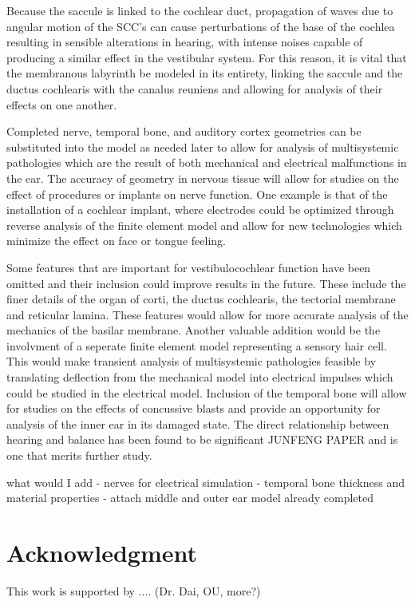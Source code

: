 \documentclass[12pt]{article}
\begin{document}
 Because the saccule is linked to the cochlear duct, propagation of waves due to angular motion of the SCC’s can cause perturbations of the base of the cochlea resulting in sensible alterations in hearing, with intense noises capable of producing a similar effect in the vestibular system. For this reason, it is vital that the membranous labyrinth be modeled in its entirety, linking the saccule and the ductus cochlearis with the canalus reuniens and allowing for analysis of their effects on one another.
   

Completed nerve, temporal bone, and auditory cortex geometries can be substituted into the model as needed later to allow for analysis of multisystemic pathologies which are the result of both mechanical and electrical malfunctions in the ear. The accuracy of geometry in nervous tissue will allow for studies on the effect of procedures or implants on nerve function. One example is that of the installation of a cochlear implant, where electrodes could be optimized through reverse analysis of the finite element model and allow for new technologies which minimize the effect on face or tongue feeling.


Some features that are important for vestibulocochlear function have been omitted and their inclusion could improve results in the future. These include the finer details of the organ of corti, the ductus cochlearis, the tectorial membrane and reticular lamina. These features would allow for more accurate analysis of the mechanics of the basilar membrane. Another valuable addition would be the involvment of a seperate finite element model representing a sensory hair cell. This would make transient analysis of multisystemic pathologies feasible by translating deflection from the mechanical model into electrical impulses which could be studied in the electrical model. \cite{choi} Inclusion of the temporal bone will allow for studies on the effects of concussive blasts and provide an opportunity for analysis of the inner ear in its damaged state. The direct relationship between hearing and balance has been found to be significant JUNFENG PAPER and is one that merits further study.

what would I add
- nerves for electrical simulation
- temporal bone thickness and material properties
- attach middle and outer ear model already completed
   
\section{Acknowledgment}
This work is supported by .... (Dr. Dai, OU, more?)



\end{document}

